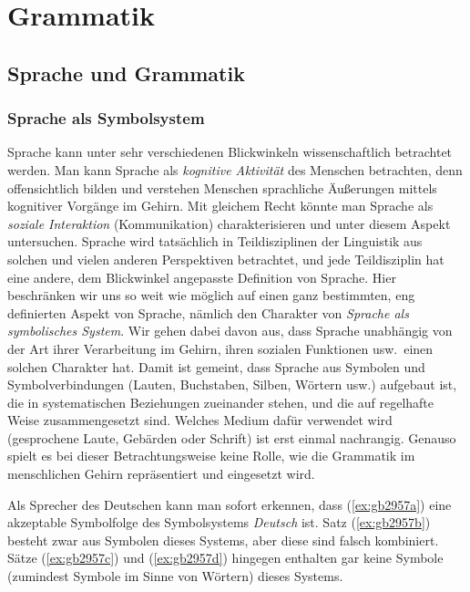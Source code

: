\chapter{Grammatik}

\label{sec:grammatik}

\section{Sprache und Grammatik}

\label{sec:spracheundgrammatik}

\subsection{Sprache als Symbolsystem}

\label{sec:sprachsystem}


Sprache kann unter sehr verschiedenen Blickwinkeln wissenschaftlich betrachtet werden.
Man kann Sprache als \textit{kognitive Aktivität} des Menschen betrachten, denn offensichtlich bilden und verstehen Menschen sprachliche Äußerungen mittels kognitiver Vorgänge im Gehirn.
Mit gleichem Recht könnte man Sprache als \textit{soziale Interaktion} (Kommunikation) charakterisieren und unter diesem Aspekt untersuchen.
Sprache wird tatsächlich in Teildisziplinen der Linguistik aus solchen und vielen anderen Perspektiven betrachtet, und jede Teildisziplin hat eine andere, dem Blickwinkel angepasste Definition von Sprache.
Hier beschränken wir uns so weit wie möglich auf einen ganz bestimmten, eng definierten Aspekt von Sprache, nämlich den Charakter von \textit{Sprache als symbolisches System}.
Wir gehen dabei davon aus, dass Sprache unabhängig von der Art ihrer Verarbeitung im Gehirn, ihren sozialen Funktionen usw.\ einen solchen Charakter hat.
Damit ist gemeint, dass Sprache aus Symbolen und Symbolverbindungen (Lauten, Buchstaben, Silben, Wörtern usw.) aufgebaut ist, die in systematischen Beziehungen zueinander stehen, und die auf regelhafte Weise zusammengesetzt sind.
Welches Medium dafür verwendet wird (\zB gesprochene Laute, Gebärden oder Schrift) ist erst einmal nachrangig.
Genauso spielt es bei dieser Betrachtungsweise keine Rolle, wie die Grammatik im menschlichen Gehirn repräsentiert und eingesetzt wird.

Als Sprecher des Deutschen kann man \zB sofort erkennen, dass (\ref{ex:gb2957a}) eine akzeptable Symbolfolge des Symbolsystems \textit{Deutsch} ist.
Satz (\ref{ex:gb2957b}) besteht zwar aus Symbolen dieses Systems, aber diese sind falsch kombiniert.
Sätze (\ref{ex:gb2957c}) und (\ref{ex:gb2957d}) hingegen enthalten gar keine Symbole (zumindest Symbole im Sinne von Wörtern) dieses Systems.

